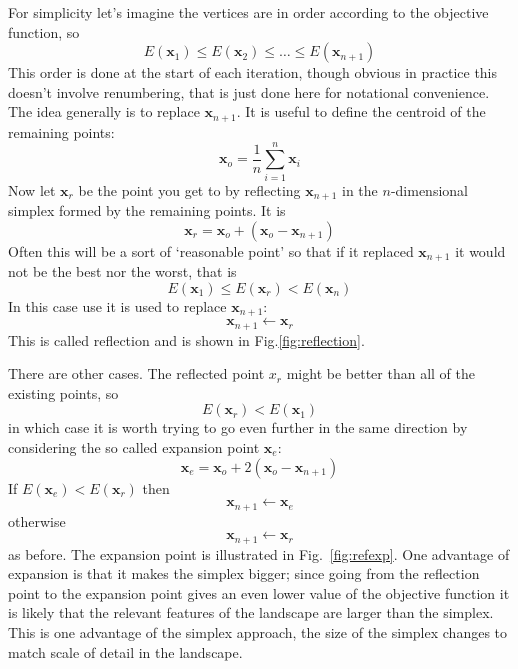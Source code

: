 \documentclass[11pt,a4paper]{scrartcl}
\begin{document}
For simplicity let's imagine the vertices are in order according to the
objective function, so
\begin{equation}
E(\mathbf{x}_1)\le E(\mathbf{x}_2)\le \ldots \le E(\mathbf{x}_{n+1})
\end{equation}
This order is done at the start of each iteration, though obvious in
practice this doesn't involve renumbering, that is just done here for
notational convenience. The idea generally is to replace
$\mathbf{x}_{n+1}$. It is useful to define the centroid of the
remaining points:
\begin{equation}
\mathbf{x}_o=\frac{1}{n}\sum_{i=1}^n\mathbf{x}_i
\end{equation}
Now let $\mathbf{x}_r$ be the point you get to by reflecting
$\mathbf{x}_{n+1}$ in the $n$-dimensional simplex formed by the
remaining points. It is
\begin{equation}
\mathbf{x}_r=\mathbf{x}_o+(\mathbf{x}_o-\mathbf{x}_{n+1})
\end{equation}
Often this will be a sort of \lq{}reasonable point\rq{} so that if it replaced
$\mathbf{x}_{n+1}$ it would not be the best nor the worst, that is
\begin{equation}
E(\mathbf{x}_1)\le E(\mathbf{x}_r) < E(\mathbf{x}_n)
\end{equation}
In this case use it is used to replace $\mathbf{x}_{n+1}$:
\begin{equation}
\mathbf{x}_{n+1}\leftarrow \mathbf{x}_r
\end{equation}
This is called reflection and is shown in
Fig.\ref{fig:reflection}.

There are other cases. The reflected point $x_r$ might be better than all
of the existing points, so
\begin{equation}
E(\mathbf{x}_r)<E(\mathbf{x}_1)
\end{equation}
in which case it is worth trying to go even further in the same
direction by considering the so called expansion point $\mathbf{x}_e$:
\begin{equation}
\mathbf{x}_e=\mathbf{x}_o+2(\mathbf{x}_o-\mathbf{x}_{n+1})
\end{equation}
If $E(\mathbf{x}_e)<E(\mathbf{x}_r)$ then
\begin{equation}
\mathbf{x}_{n+1}\leftarrow \mathbf{x}_e
\end{equation}
otherwise
\begin{equation}
\mathbf{x}_{n+1}\leftarrow \mathbf{x}_r
\end{equation}
as before. The expansion point is illustrated in
Fig.~\ref{fig:refexp}. One advantage of expansion is that it makes the
simplex bigger; since going from the reflection point to the expansion
point gives an even lower value of the objective function it is likely
that the relevant features of the landscape are larger than the
simplex. This is one advantage of the simplex approach, the size of
the simplex changes to match scale of detail in the landscape.
\end{document}
